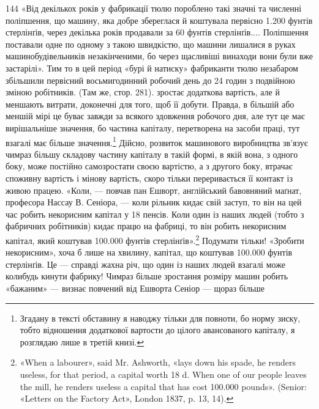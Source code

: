 144 «Від декількох років у фабрикації тюлю пороблено такі значні та
численні поліпшення, що машину, яка добре збереглася й коштувала
первісно 1.200 фунтів стерлінґів, через декілька років продавали за
60 фунтів стерлінґів.... Поліпшення поставали одне по одному з такою
швидкістю, що машини лишалися в руках машинобудівельників незакінченими,
бо через щасливіші винаходи вони були вже застарілі». Тим то
в цей період «бурі й натиску» фабриканти тюлю незабаром збільшили первісний
восьмигодинний робочий день до 24 годин з подвійною зміною
робітників. (Там же, стор. 281).
зростає додаткова вартість, але й меншають витрати, доконечні
для того, щоб її добути. Правда, в більшій або меншій мірі це
буває завжди за всякого здовження робочого дня, але тут це
має вирішальніше значення, бо частина капіталу, перетворена
на засоби праці, тут взагалі має більше значення.\footnote{
Згадану в тексті обставину я наводжу тільки для повноти, бо
норму зиску, тобто відношення додаткової вартости до цілого авансованого
капіталу, я розглядаю лише в третій книзі.
} Дійсно,
розвиток машинового виробництва зв’язує чимраз більшу складову
частину капіталу в такій формі, в якій вона, з одного боку, може
постійно самозростати своєю вартістю, а з другого боку, втрачає
споживну вартість і мінову вартість, скоро тільки переривається
її контакт із живою працею. «Коли, — повчав пан Ешворт,
англійський бавовняний маґнат, професора Нассау В. Сеніора, —
коли рільник кидає свій заступ, то він на цей час робить некорисним
капітал у 18 пенсів. Коли один із наших людей (тобто
з фабричних робітників) кидає працю на фабриці, то він робить
некорисним капітал, який коштував 100.000 фунтів стерлінґів».\footnote{
«When a labourer», said Mr. Ashworth, «lays down his spade, he
renders useless, for that period, a capital worth 18 d. When one of our people
leaves the mill, he renders useless a capital that has cost 100.000 pounds».
(Senior: «Letters on the Factory Act», London 1837, p. 13, 14).
}
Подумати тільки! «Зробити некорисним», хоча б лише на хвилину,
капітал, що коштував 100.000 фунтів стерлінґів. Це — справді
жахна річ, що один із наших людей взагалі може колибудь кинути
фабрику! Чимраз більше зростання розміру машин робить «бажаним»
— визнає повчений від Ешворта Сеніор — щораз більше
